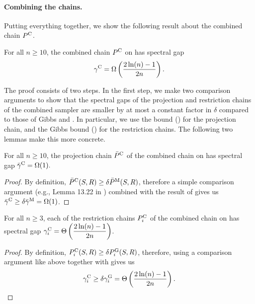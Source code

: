 \paragraph{Combining the chains.}
Putting everything together, we show the following result about the combined chain $P^{\mathrm{C}}$.
\begin{theorem} \label{thm:combo}
  For all $n \geq 10$, the combined chain $P^{\mathrm{C}}$ on \ising{} has spectral gap
  \begin{align*}
    \gamma^{\mathrm{C}} = \Omega\left( \displaystyle\frac{2\ln(n) - 1}{2n} \right).
  \end{align*}
\end{theorem}
\noindent The proof consists of two steps.
In the first step, we make two comparison arguments \citep{diaconis93,levin08book} to show that the spectral gaps of the projection and restriction chains of the combined sampler are smaller by at most a constant factor in $\delta$ compared to those of Gibbs and \Ms{}.
In particular, we use the \Ms{} bound () for the projection chain, and the Gibbs bound () for the restriction chains.
The following two lemmas make this more concrete.

\begin{lemma} \label{lem:cproj}
  For all $n \geq 10$, the projection chain $\bar{P}^{\mathrm{C}}$ of the combined chain on \ising{} has spectral gap $\bar{\gamma}^{\mathrm{C}} = \Omega(1).$
\end{lemma}

\begin{proof}
  By definition, $\bar{P}^{\mathrm{C}}(S, R) \geq \delta \bar{P}^{\mathrm{M}}(S, R)$, therefore a simple comparison argument (e.g., Lemma 13.22 in \citep{levin08book}) combined with the result of  gives us $\bar{\gamma}^{\mathrm{C}} \geq \delta \bar{\gamma}^{\mathrm{M}} = \Omega(1)$.
\end{proof}

\begin{lemma} \label{lem:crest}
  For all $n \geq 3$, each of the restriction chains $P^{\mathrm{C}}_i$ of the combined chain on \ising{} has spectral gap $\gamma^{\mathrm{C}}_i = \Theta\left(\displaystyle\frac{2\ln(n) - 1}{2n}\right)$.
\end{lemma}

\begin{proof}
  By definition, $P^{\mathrm{C}}_i(S, R) \geq \delta P^{\mathrm{G}}_i(S, R)$, therefore, using a comparison argument like above together with  gives us
  \begin{align*}
  \gamma^{\mathrm{C}}_i \geq \delta \gamma^{\mathrm{G}}_i = \Theta\left(\displaystyle\frac{2\ln(n) - 1}{2n}\right).
  \end{align*}
\end{proof}

